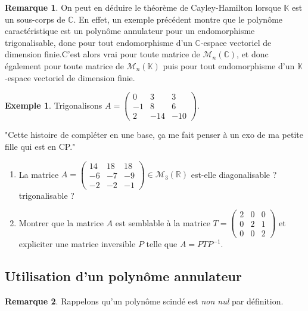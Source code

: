\documentclass[french]{article}
\newcommand{\R}{\mathbb{R}}
\newcommand{\C}{\mathbb{C}}
\newcommand{\K}{\mathbb{K}}
\newcommand{\inv}{^{-1}}
\theoremstyle{plain}
\theoremstyle{definition}
\newtheorem*{ex}{Exemple}
\newtheorem*{rmq}{Remarque}
\theoremstyle{remark}
\begin{document}
	\begin{rmq}
		On peut en déduire le théorème de Cayley-Hamilton lorsque $\K$ est un sous-corps de $\C$. En effet, un exemple précédent montre que le polynôme caractéristique est un polynôme annulateur pour un endomorphisme trigonalisable, donc pour tout endomorphisme d'un $\C$-espace vectoriel de dimension finie.C'est alors vrai pour toute matrice de $\mathcal{M}_n(\C)$, et donc également pour toute matrice de $\mathcal{M}_n(\K)$ puis pour tout endomorphisme d'un $\K$-espace vectoriel de dimension finie.
	\end{rmq}
	
	\begin{ex}
		Trigonalisons $A=\begin{pmatrix}
			0&3&3\\
			-1&8&6\\
			2&-14&-10
		\end{pmatrix}$.
	\end{ex}
	
	"Cette histoire de compléter en une base, ça me fait penser à un exo de ma petite fille qui est en CP."
	
	\begin{exo}
		\begin{enumerate}
			\item La matrice $A=\begin{pmatrix}
				14&18&18\\
				-6&-7&-9\\
				-2&-2&-1
			\end{pmatrix}\in\mathcal{M}_3(\R)$ est-elle diagonalisable ? trigonalisable ?
			\item Montrer que la matrice $A$ est semblable à la matrice $T=\begin{pmatrix}
				2&0&0\\
				0&2&1\\
				0&0&2
			\end{pmatrix}$ et expliciter une matrice inversible $P$ telle que $A=PTP\inv$.
		\end{enumerate}
	\end{exo}
	
	\subsection{Utilisation d'un polynôme annulateur}
	
	\begin{rmq}
		Rappelons qu'un polynôme scindé est \textit{non nul} par définition.
	\end{rmq}
	
\end{document}
